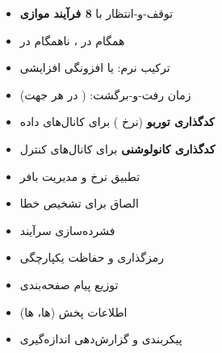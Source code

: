 \begin{itemize}
\tightlist
\item
   توقف-و-انتظار با \textbf{8 فرآیند موازی}
\item
  همگام در ، ناهمگام در 
\item
  ترکیب نرم:  یا افزونگی افزایشی
\item
  زمان رفت-و-برگشت:  ( در هر جهت)
\end{itemize}


\begin{itemize}
\tightlist
\item
  \textbf{کدگذاری توربو} (نرخ ) برای کانال‌های داده
\item
  \textbf{کدگذاری کانولوشنی} برای کانال‌های کنترل
\item
  تطبیق نرخ و مدیریت بافر 
\item
  الصاق  برای تشخیص خطا
\end{itemize}


\begin{itemize}
\tightlist
\item
  فشرده‌سازی سرآیند 
\item
  رمزگذاری و حفاظت یکپارچگی
\item
  توزیع پیام صفحه‌بندی
\item
  اطلاعات پخش (ها، ها)
\item
  پیکربندی و گزارش‌دهی اندازه‌گیری
\end{itemize}




\CNchained{}






